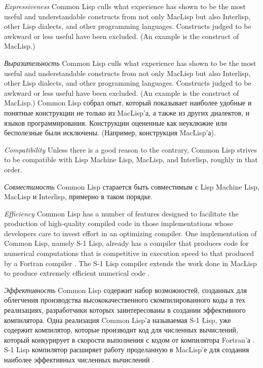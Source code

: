 \begin{flushdesc}
\item[{\it Expressiveness}]
Common Lisp culls what
experience has shown to be the most useful and understandable constructs
from not only MacLisp but also
Interlisp, other Lisp dialects, and other programming languages.
Constructs judged to be awkward or less useful have been
excluded.   (An example is the  construct of MacLisp.)

\item[{\it Выразительность}]
Common Lisp culls what
experience has shown to be the most useful and understandable constructs
from not only MacLisp but also
Interlisp, other Lisp dialects, and other programming languages.
Constructs judged to be awkward or less useful have been
excluded.   (An example is the  construct of MacLisp.)
Common Lisp собрал опыт, который показывает наиболее удобные и
понятные конструкции не только из MacLisp'а, а также из других
диалектов, и языков программирования. Конструкции оцененные как
неуклюжие или бесполезные были исключены. (Например, 
конструкция MacLisp'а).

\item[{\it Compatibility}]
Unless there is a good reason to the contrary,
Common Lisp strives to be compatible with Lisp Machine Lisp, MacLisp, and
Interlisp, roughly in that order.

\item[{\it Совместимость}]
Common Lisp старается быть совместимым с Lisp Machine Lisp,
MacLisp и Interlisp, примерно в таком порядке.

\item[{\it Efficiency}]
Common Lisp has a number of features designed to
facilitate the production of high-quality compiled code in those
implementations whose developers
care to invest effort in an optimizing compiler.
One implementation of Common Lisp, namely S-1 Lisp, already has a compiler
that produces code for numerical computations that is competitive
in execution speed to that produced by a Fortran compiler \cite{S1-COMPILER}.
The S-1 Lisp compiler
extends the work done in MacLisp to produce extremely efficient
numerical code \cite{MACLISP-BEATS-FORTRAN}.

\item[{\it Эффективность}]
Common Lisp содержит набор возможностей, созданных для облегчения
производства высококачественного скомпилированного коды в тех
реализациях, разработчики которых заинтересованы в создании
эффективного компилятора. Одна реализация Common Lisp'а называемая
S-1 Lisp, уже содержит компилятор, которые производит код для
численных вычислений, который конкурирует в скорости выполнения
с кодом от компилятора Fortran'а \cite{S1-COMPILER}. S-1 Lisp
компилятор расширяет работу проделанную в MacLisp'е для создания
наиболее эффективных численных вычислений \cite{MACLISP-BEATS-FORTRAN}.


\end{flushdesc}

